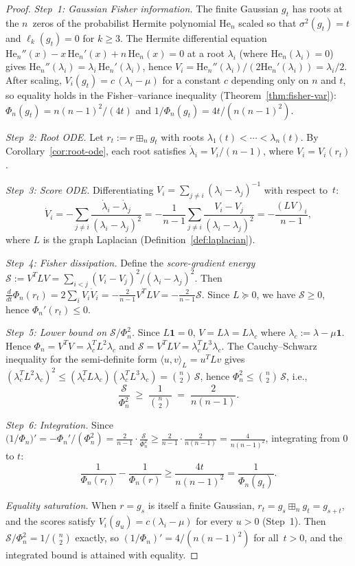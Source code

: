 \documentclass[10pt,a4paper]{amsart}
\theoremstyle{plain}
\theoremstyle{definition}
\theoremstyle{remark}
\newcommand{\fp}{\boxplus_n}
\begin{document}
\begin{proof}
\emph{Step~1: Gaussian Fisher information.}
The finite Gaussian $g_t$ has roots at the
$n$~zeros of the probabilist Hermite polynomial $\mathrm{He}_n$
scaled so that $\sigma^2(g_t)=t$ and
$\ell_k(g_t)=0$ for $k\ge 3$.
The Hermite differential equation
$\mathrm{He}_n''(x)-x\,\mathrm{He}_n'(x)+n\,\mathrm{He}_n(x)=0$
at a root $\lambda_i$ (where $\mathrm{He}_n(\lambda_i)=0$) gives
$\mathrm{He}_n''(\lambda_i)=\lambda_i\,\mathrm{He}_n'(\lambda_i)$,
hence
$V_i=\mathrm{He}_n''(\lambda_i)/(2\mathrm{He}_n'(\lambda_i))
=\lambda_i/2$.
After scaling, $V_i(g_t)=c\,(\lambda_i-\mu)$
for a constant $c$ depending only on $n$ and $t$,
so equality holds in the Fisher--variance inequality
(Theorem~\ref{thm:fisher-var}):
$\Phi_n(g_t)=n(n-1)^2/(4t)$
and $1/\Phi_n(g_t)=4t/(n(n-1)^2)$.

\emph{Step~2: Root ODE.}
Let $r_t:=r\fp g_t$ with roots
$\lambda_1(t)<\cdots<\lambda_n(t)$.
By Corollary~\ref{cor:root-ode},
each root satisfies
$\dot\lambda_i = V_i/(n-1)$,
where $V_i=V_i(r_t)$.

\emph{Step~3: Score ODE.}
Differentiating
$V_i=\sum_{j\ne i}(\lambda_i-\lambda_j)^{-1}$
with respect to~$t$:
\[
  \dot V_i
  = -\sum_{j\ne i}
    \frac{\dot\lambda_i-\dot\lambda_j}
         {(\lambda_i-\lambda_j)^2}
  = -\frac{1}{n-1}\sum_{j\ne i}
    \frac{V_i-V_j}{(\lambda_i-\lambda_j)^2}
  = -\frac{(LV)_i}{n-1},
\]
where $L$ is the graph Laplacian
(Definition~\ref{def:laplacian}).

\emph{Step~4: Fisher dissipation.}
Define the \emph{score-gradient energy}
$\mathcal{S}:=V^T LV
  =\sum_{i<j}(V_i-V_j)^2
   /(\lambda_i-\lambda_j)^2$.
Then
$\frac{d}{dt}\Phi_n(r_t)
  = 2\sum_i V_i\dot V_i
  = -\frac{2}{n-1}V^T L V
  = -\frac{2}{n-1}\mathcal{S}$.
Since $L\succeq 0$, we have
$\mathcal{S}\ge 0$, hence
$\Phi_n'(r_t)\le 0$.

\emph{Step~5: Lower bound on $\mathcal{S}/\Phi_n^2$.}
Since $L\mathbf{1}=0$, $V=L\lambda=L\lambda_c$
where $\lambda_c:=\lambda-\mu\mathbf{1}$.
Hence $\Phi_n=V^T V=\lambda_c^T L^2\lambda_c$
and $\mathcal{S}=V^T LV=\lambda_c^T L^3\lambda_c$.
The Cauchy--Schwarz inequality for the
semi-definite form $\langle u,v\rangle_L=u^T Lv$ gives
$(\lambda_c^T L^2\lambda_c)^2
\le(\lambda_c^T L\lambda_c)
   (\lambda_c^T L^3\lambda_c)
=\binom{n}{2}\,\mathcal{S}$,
hence $\Phi_n^2\le\binom{n}{2}\,\mathcal{S}$,
i.e.,
\[
  \frac{\mathcal{S}}{\Phi_n^2}
  \;\ge\;\frac{1}{\binom{n}{2}}
  \;=\;\frac{2}{n(n-1)}.
\]

\emph{Step~6: Integration.}
Since
$\bigl(1/\Phi_n\bigr)'
  = -\Phi_n'/(\Phi_n^2)
  = \frac{2}{n-1}\cdot
    \frac{\mathcal{S}}{\Phi_n^2}
  \ge \frac{2}{n-1}\cdot
      \frac{2}{n(n-1)}
  = \frac{4}{n(n-1)^2}$,
integrating from $0$ to $t$:
\[
  \frac{1}{\Phi_n(r_t)}
  -\frac{1}{\Phi_n(r)}
  \ge \frac{4t}{n(n-1)^2}
  = \frac{1}{\Phi_n(g_t)}.
\]

\emph{Equality saturation.}
When $r=g_s$ is itself a finite Gaussian,
$r_t=g_s\fp g_t=g_{s+t}$,
and the scores satisfy
$V_i(g_u)=c(\lambda_i-\mu)$ for every $u>0$
(Step~1).
Then $\mathcal{S}/\Phi_n^2=1/\binom{n}{2}$ exactly,
so $(1/\Phi_n)'=4/(n(n-1)^2)$ for all~$t>0$,
and the integrated bound is attained with equality.
\end{proof}
\end{document}
